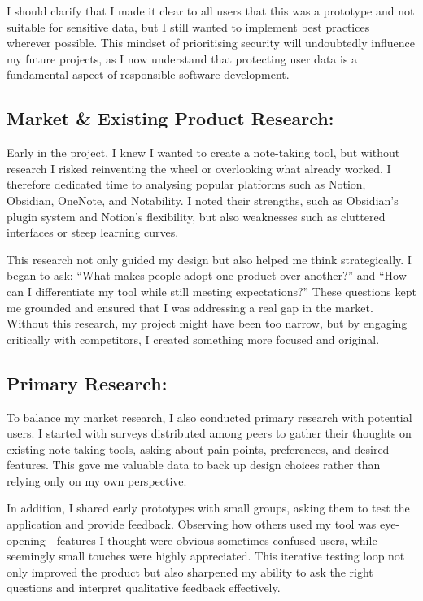 I should clarify that I made it clear to all users that this was a prototype and not suitable for sensitive data, but I still wanted to implement best practices wherever possible. This mindset of prioritising security will undoubtedly influence my future projects, as I now understand that protecting user data is a fundamental aspect of responsible software development.

\subsection{Market \& Existing Product Research:}
Early in the project, I knew I wanted to create a note-taking tool, but without research I risked reinventing the wheel or overlooking what already worked. I therefore dedicated time to analysing popular platforms such as Notion, Obsidian, OneNote, and Notability. I noted their strengths, such as Obsidian's plugin system and Notion's flexibility, but also weaknesses such as cluttered interfaces or steep learning curves.

This research not only guided my design but also helped me think strategically. I began to ask: “What makes people adopt one product over another?” and “How can I differentiate my tool while still meeting expectations?” These questions kept me grounded and ensured that I was addressing a real gap in the market. Without this research, my project might have been too narrow, but by engaging critically with competitors, I created something more focused and original.

\subsection{Primary Research:}
To balance my market research, I also conducted primary research with potential users. I started with surveys distributed among peers to gather their thoughts on existing note-taking tools, asking about pain points, preferences, and desired features. This gave me valuable data to back up design choices rather than relying only on my own perspective.

In addition, I shared early prototypes with small groups, asking them to test the application and provide feedback. Observing how others used my tool was eye-opening - features I thought were obvious sometimes confused users, while seemingly small touches were highly appreciated. This iterative testing loop not only improved the product but also sharpened my ability to ask the right questions and interpret qualitative feedback effectively.



